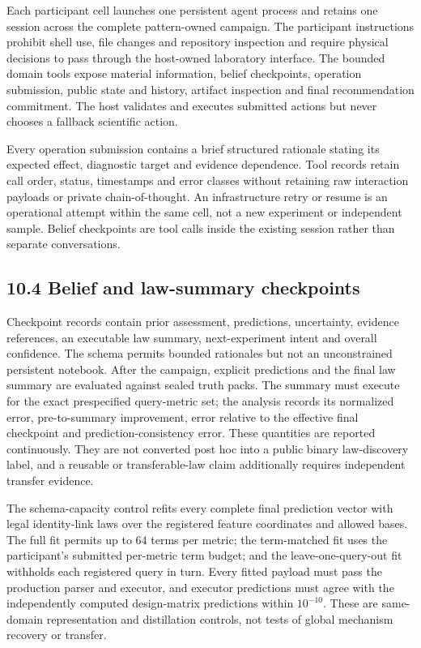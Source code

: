 \documentclass[10pt,twocolumn]{article}
\begin{document}
Each participant cell launches one persistent agent process and retains
one session across the complete pattern-owned campaign. The participant
instructions prohibit shell use, file changes and repository inspection
and require physical decisions to pass through the host-owned laboratory
interface. The bounded domain tools expose material information, belief
checkpoints, operation submission, public state and history, artifact
inspection and final recommendation commitment. The host validates and
executes submitted actions but never chooses a fallback scientific
action.

Every operation submission contains a brief structured rationale stating
its expected effect, diagnostic target and evidence dependence. Tool
records retain call order, status, timestamps and error classes without
retaining raw interaction payloads or private chain-of-thought. An
infrastructure retry or resume is an operational attempt within the same
cell, not a new experiment or independent sample. Belief checkpoints are
tool calls inside the existing session rather than separate
conversations.

\subsection{10.4 Belief and law-summary
checkpoints}\label{belief-and-law-summary-checkpoints}

Checkpoint records contain prior assessment, predictions, uncertainty,
evidence references, an executable law summary, next-experiment intent
and overall confidence. The schema permits bounded rationales but not an
unconstrained persistent notebook. After the campaign, explicit
predictions and the final law summary are evaluated against sealed truth
packs. The summary must execute for the exact prespecified query-metric
set; the analysis records its normalized error, pre-to-summary
improvement, error relative to the effective final checkpoint and
prediction-consistency error. These quantities are reported
continuously. They are not converted post hoc into a public binary
law-discovery label, and a reusable or transferable-law claim
additionally requires independent transfer evidence.

The schema-capacity control refits every complete final prediction
vector with legal identity-link laws over the registered feature
coordinates and allowed bases. The full fit permits up to 64 terms per
metric; the term-matched fit uses the participant's submitted per-metric
term budget; and the leave-one-query-out fit withholds each registered
query in turn. Every fitted payload must pass the production parser and
executor, and executor predictions must agree with the independently
computed design-matrix predictions within \(10^{-10}\). These are
same-domain representation and distillation controls, not tests of
global mechanism recovery or transfer.
\end{document}
